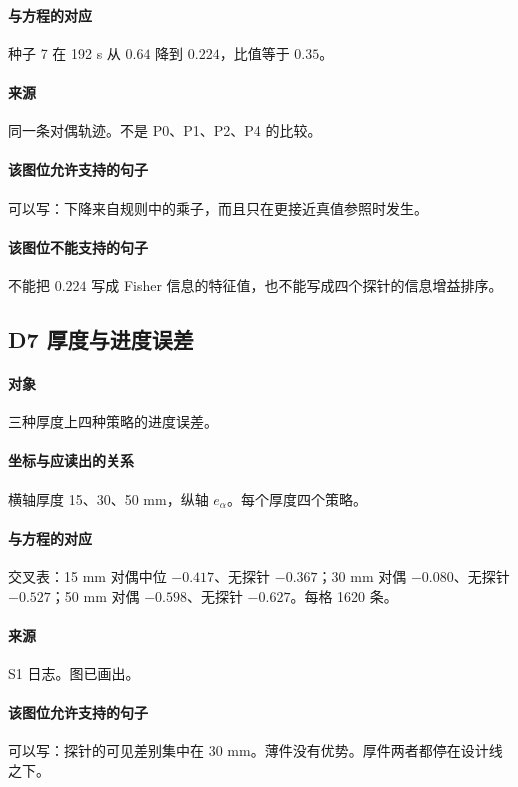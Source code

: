 \paragraph{与方程的对应}
种子 7 在 192 s 从 $0.64$ 降到 $0.224$，比值等于 $0.35$。

\paragraph{来源}
同一条对偶轨迹。不是 P0、P1、P2、P4 的比较。

\paragraph{该图位允许支持的句子}
可以写：下降来自规则中的乘子，而且只在更接近真值参照时发生。

\paragraph{该图位不能支持的句子}
不能把 $0.224$ 写成 Fisher 信息的特征值，也不能写成四个探针的信息增益排序。

\subsection{D7 厚度与进度误差}
\paragraph{对象}
三种厚度上四种策略的进度误差。

\paragraph{坐标与应读出的关系}
横轴厚度 15、30、50 mm，纵轴 $e_\alpha$。每个厚度四个策略。

\paragraph{与方程的对应}
交叉表：15 mm 对偶中位 $-0.417$、无探针 $-0.367$；30 mm 对偶 $-0.080$、无探针 $-0.527$；50 mm 对偶 $-0.598$、无探针 $-0.627$。每格 1620 条。

\paragraph{来源}
S1 日志。图已画出。

\paragraph{该图位允许支持的句子}
可以写：探针的可见差别集中在 30 mm。薄件没有优势。厚件两者都停在设计线之下。

